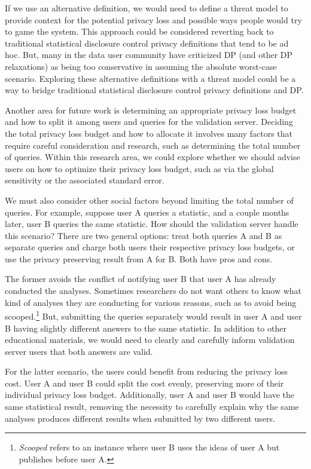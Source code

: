 If we use an alternative definition, we would need to define a threat model to provide context for the potential privacy loss and possible ways people would try to game the system. This approach could be considered reverting back to traditional statistical disclosure control privacy definitions that tend to be ad hoc. But, many in the data user community have criticized DP (and other DP relaxations) as being too conservative in assuming the absolute worst-case scenario. Exploring these alternative definitions with a threat model could be a way to bridge traditional statistical disclosure control privacy definitions and DP.

Another area for future work is determining an appropriate privacy loss budget and how to split it among users and queries for the validation server. Deciding the total privacy loss budget and how to allocate it involves many factors that require careful consideration and research, such as determining the total number of queries. Within this research area, we could explore whether we should advise users on how to optimize their privacy loss budget, such as via the global sensitivity or the associated standard error.

We must also consider other social factors beyond limiting the total number of queries. For example, suppose user A queries a statistic, and a couple months later, user B queries the same statistic. How should the validation server handle this scenario? There are two general options: treat both queries A and B as separate queries and charge both users their respective privacy loss budgets, or use the privacy preserving result from A for B. Both have pros and cons.

The former avoids the conflict of notifying user B that user A has already conducted the analyses. Sometimes researchers do not want others to know what kind of analyses they are conducting for various reasons, such as to avoid being scooped.\footnote{\textit{Scooped} refers to an instance where user B uses the ideas of user A but publishes before user A.} But, submitting the queries separately would result in user A and user B having slightly different answers to the same statistic. In addition to other educational materials, we would need to clearly and carefully inform validation server users that both answers are valid.

For the latter scenario, the users could benefit from reducing the privacy loss cost. User A and user B could split the cost evenly, preserving more of their individual privacy loss budget. Additionally, user A and user B would have the same statistical result, removing the necessity to carefully explain why the same analyses produces different results when submitted by two different users.

